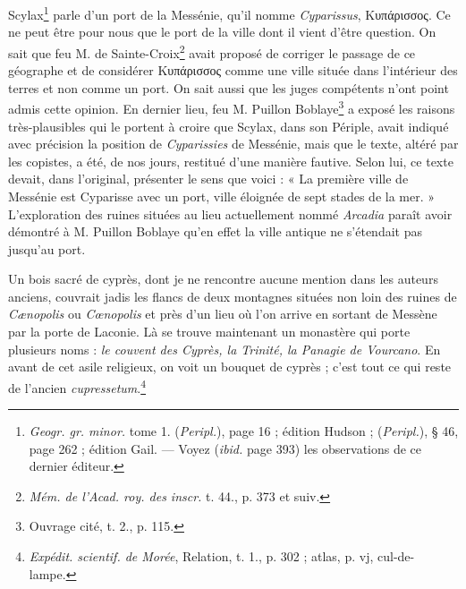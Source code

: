 \documentclass{article}
\begin{document}
Scylax\footnote{\emph{Geogr. gr. minor.} tome 1. (\emph{Peripl.}), page 16 ; édition Hudson ; (\emph{Peripl.}), § 46, page 262 ; édition Gail. --- Voyez (\emph{ibid.} page 393) les observations de ce dernier éditeur.} parle d'un port de la Messénie, qu'il nomme \emph{Cyparissus}, \textgreek{Κυπάρισσος}. Ce ne peut être pour nous que le port de la ville dont il vient d'être question. On sait que feu M. de Sainte-Croix\footnote{\emph{Mém. de l'Acad. roy. des inscr.} t. 44., p. 373 et suiv.} avait proposé de corriger le passage de ce géographe et de considérer \textgreek{Κυπάρισσος} comme une ville située dans l'intérieur des terres et non comme un port. On sait aussi que les juges compétents n'ont point admis cette opinion. En dernier lieu, feu M. Puillon Boblaye\footnote{Ouvrage cité, t. 2., p. 115.} a exposé les raisons très-plausibles qui le portent à croire que Scylax, dans son Périple, avait indiqué avec précision la position de \emph{Cyparissies} de Messénie, mais que le texte, altéré par les copistes, a été, de nos jours, restitué d'une manière fautive. Selon lui, ce texte devait, dans l'original, présenter le sens que voici : « La première ville de Messénie est Cyparisse avec un port, ville éloignée de sept stades de la mer. » L'exploration des ruines situées au lieu actuellement nommé \emph{Arcadia} paraît avoir démontré à M. Puillon Boblaye qu'en effet la ville antique ne s'étendait pas jusqu'au port.

Un bois sacré de cyprès, dont je ne rencontre aucune mention dans les auteurs anciens, couvrait jadis les flancs de deux montagnes situées non loin des ruines de \emph{Cænopolis} ou \emph{Cœnopolis} et près d'un lieu où l'on arrive en sortant de Messène par la porte de Laconie. Là se trouve maintenant un monastère qui porte plusieurs noms : \emph{le couvent des Cyprès, la Trinité, la Panagie de Vourcano}. En avant de cet asile religieux, on voit un bouquet de cyprès ; c'est tout ce qui reste de l'ancien \emph{cupressetum}.\footnote{\emph{Expédit. scientif. de Morée}, Relation, t. 1., p. 302 ; atlas, p. vj, cul-de-lampe.}
\end{document}
